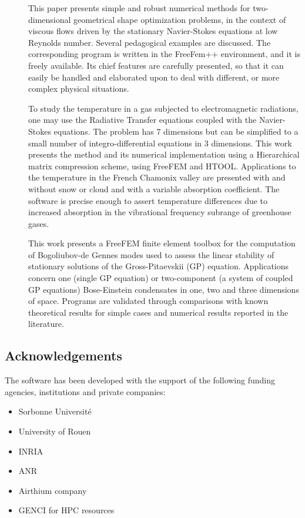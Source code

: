 \begin{description}
\item[] This paper presents simple and robust numerical methods for two-dimensional geometrical shape optimization problems, in the context of viscous flows driven by the stationary Navier-Stokes equations at low Reynolds number. Several pedagogical examples are discussed. The corresponding program is written in the FreeFem++ environment, and it is freely available. Its chief features are carefully presented, so that it can easily be handled and elaborated upon to deal with different, or more complex physical situations.

\item[] To study the temperature in a gas subjected to electromagnetic radiations, one may use the Radiative Transfer equations coupled with the Navier-Stokes equations. The problem has 7 dimensions but can be simplified to a small number of integro-differential equations in 3 dimensions. This work presents the method and its numerical implementation using a Hierarchical matrix compression scheme, using FreeFEM and HTOOL. Applications to the temperature in the French Chamonix valley are presented with and without snow or cloud and with a variable absorption coefficient. The software is precise enough to assert temperature differences due to increased absorption in the vibrational frequency subrange of greenhouse gases.

\item[] This work presents a FreeFEM finite element toolbox for the computation of Bogoliubov-de Gennes modes used to assess the linear stability of stationary solutions of the Gross-Pitaevskii (GP) equation. Applications concern one (single GP equation) or two-component (a system of coupled GP equations) Bose-Einstein condensates in one, two and three dimensions of space. Programs are validated through comparisons with known theoretical results for simple cases and numerical results reported in the literature.
\end{description}

\subsection{Acknowledgements}
\label{sec::Freefem++:acknowledgements}

The software has been developed with the support of the following funding agencies, institutions and private companies:

\begin{itemize}
\item Sorbonne Université
\item University of Rouen
\item INRIA
\item ANR
\item Airthium company
\item GENCI for HPC resources
\end{itemize}
